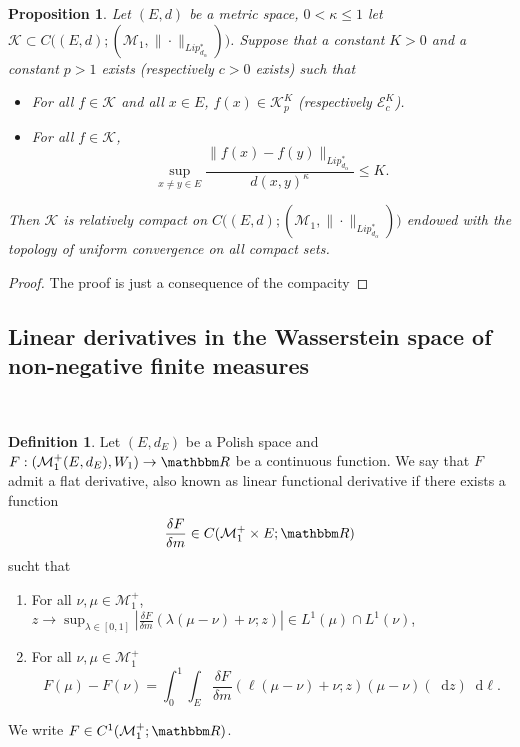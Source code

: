 \documentclass[a4paper,11pt, reqno]{amsart}
\newcommand{\cE}{\mathcal{E}}	\newcommand{\EE}{\mathbbm{E}}
\newcommand{\cK}{\mathcal{K}}	\newcommand{\KK}{\mathbbm{K}}
\newcommand{\cM}{\mathcal{M}}	\newcommand{\MM}{\mathbbm{M}}
\newcommand{\dd}{\mathop{}\!\mathrm{d}}
\newcommand{\1}{\mathbbm{1}}
\theoremstyle{plain}
\newtheorem{proposition}[theorem]{Proposition}
\theoremstyle{definition}
\newtheorem{definition}[theorem]{Definition}
\begin{document}
\begin{proposition}
    Let $(E,d)$ be a metric space, $0<\kappa\le1$ let $\cK \subset C\big((E,d); (\cM_1,\|\cdot\|_{Lip^*_{d_\alpha}})\big)$. Suppose that a constant $K>0$ and a constant $p>1$ exists (respectively $c>0$ exists) such that
    \begin{itemize}
        \item For all $f\in \cK$ and all $x\in E$, $f(x) \in \cK^{K}_p$ (respectively $\cE^K_c$).
        \item For all $f\in \cK$, 
        \[\sup_{x\neq y \in E} \frac{\|f(x)-f(y)\|_{Lip^*_{d_\alpha}}}{d(x,y)^\kappa} \le K.\]
    \end{itemize}
    Then $\cK$ is relatively compact on $C\big((E,d); (\cM_1,\|\cdot\|_{Lip^*_{d_\alpha}})\big)$ endowed with the topology of uniform convergence on all compact sets. 
\end{proposition}

\begin{proof}
    The proof is just a consequence of the compacity 
\end{proof}

\subsection{Linear derivatives in the Wasserstein space of non-negative finite
measures}

\

\begin{definition}
  Let $(E, d_E)$ be a Polish space and $F : (\cM^+_1 (E, d_E), W_1)
  \rightarrow \RR$ be a continuous function. We say that $F$ admit a
  flat derivative, also known as linear functional derivative if there exists
  a function
  \[ \frac{\delta F}{\delta m} \in C (\cM_1^+ \times E ; \RR)
  \]
  sucht that
  \begin{enumerate}
      \item For all $\nu,\mu\in \cM_1^+$, $z\to \sup_{\lambda \in [0,1]} \left|\frac{\delta F}{\delta m} (\lambda (\mu- \nu) + \nu;z)\right| \in L^1(\mu)\cap L^1(\nu)$,
      \item For all $\nu,\mu\in \cM_1^+$
      \[ F (\mu) - F (\nu) = \int_0^1 \int_E \frac{\delta F}{\delta m} (\ell (\mu
     - \nu) + \nu ;  z) (\mu - \nu) (\dd z) \dd
     \ell . \]
  \end{enumerate}
  We write $F \in C^1 (\cM_1^+ ; \RR)$.  
\end{definition}
\end{document}
